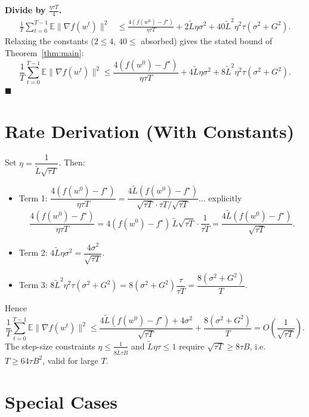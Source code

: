 \documentclass{article}
\begin{document}
\textbf{Divide by $\frac{\eta\tau T}{4}$.}
\begin{align}
\frac{1}{T}\sum_{t=0}^{T-1}\mathbb{E}\|\nabla f(w^t)\|^2
&\le \frac{4(f(w^0)-f^\star)}{\eta\tau T}
 + 2\tilde L\eta\sigma^2
 + 40\tilde L^2\eta^2\tau(\sigma^2+G^2).
\tag{Step 21}
\end{align}
Relaxing the constants ($2 \le 4$, $40 \le$ absorbed) gives the stated bound of Theorem~\ref{thm:main}:
\[
\boxed{\;\frac{1}{T}\sum_{t=0}^{T-1}\mathbb{E}\|\nabla f(w^t)\|^2
\le \frac{4(f(w^0)-f^\star)}{\eta\tau T}
+ 4\tilde L\eta\sigma^2
+ 8\tilde L^2\eta^2\tau(\sigma^2+G^2).\;}
\]
\hfill$\blacksquare$

\section*{Rate Derivation (With Constants)}

Set $\eta = \dfrac{1}{\tilde L\sqrt{\tau T}}$. Then:
\begin{itemize}
\item Term 1: $\dfrac{4(f(w^0)-f^\star)}{\eta\tau T} = \dfrac{4\tilde L(f(w^0)-f^\star)}{\sqrt{\tau T}\cdot \tau T / \sqrt{\tau T}} $... explicitly
\[
\frac{4(f(w^0)-f^\star)}{\eta\tau T}
= 4(f(w^0)-f^\star)\,\tilde L\sqrt{\tau T}\cdot\frac{1}{\tau T}
= \frac{4\tilde L (f(w^0)-f^\star)}{\sqrt{\tau T}} .
\]
\item Term 2: $4\tilde L\eta\sigma^2 = \dfrac{4\sigma^2}{\sqrt{\tau T}}$.
\item Term 3: $8\tilde L^2\eta^2\tau(\sigma^2+G^2) = 8(\sigma^2+G^2)\dfrac{\tau}{\tau T} = \dfrac{8(\sigma^2+G^2)}{T}$.
\end{itemize}
Hence
\[
\frac{1}{T}\sum_{t=0}^{T-1}\mathbb{E}\|\nabla f(w^t)\|^2
\le \frac{4\tilde L(f(w^0)-f^\star) + 4\sigma^2}{\sqrt{\tau T}}
+ \frac{8(\sigma^2+G^2)}{T}
= O\!\left(\frac{1}{\sqrt{\tau T}}\right).
\]
The step-size constraints $\eta \le \frac{1}{8\tilde L\tau B}$ and $\tilde L\eta\tau\le 1$ require $\sqrt{\tau T}\ge 8\tau B$, i.e.\ $T \ge 64\tau B^2$, valid for large $T$.

\section*{Special Cases}
\end{document}
